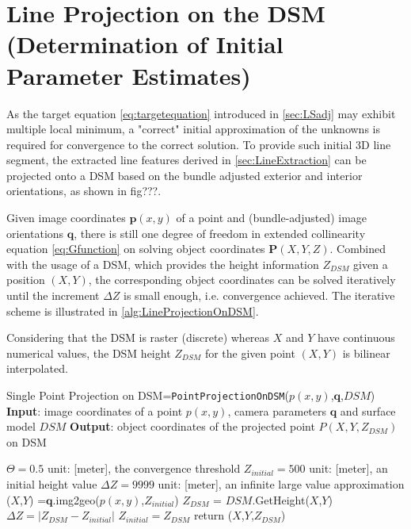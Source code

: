 \clearpage
\section{Line Projection on the DSM (Determination of Initial Parameter Estimates)}
\label{sec:LineProjectionOnDSM}

As the target equation \ref{eq:targetequation} introduced in \cref{sec:LSadj} may exhibit multiple local minimum, a "correct" initial approximation of the unknowns is required for convergence to the correct solution. To provide such initial 3D line segment, the extracted line features derived in \cref{sec:LineExtraction} can be projected onto a DSM based on the bundle adjusted exterior and interior orientations, as shown in fig???.


Given image coordinates $\mathbf{p}(x,y)$ of a point and (bundle-adjusted) image orientations $\mathbf{q}$, there is still one degree of freedom in extended collinearity equation \eqref{eq:Gfunction} on solving object coordinates $\mathbf{P}(X,Y,Z)$. Combined with the usage of a DSM, which provides the height information $Z_{DSM}$ given a position $(X,Y)$, the corresponding object coordinates can be solved iteratively until the increment $\Delta Z$ is small enough, i.e. convergence achieved. The iterative scheme is illustrated in \cref{alg:LineProjectionOnDSM}.

Considering that the DSM is raster (discrete) whereas $X$ and $Y$ have continuous numerical values, the DSM height $Z_{DSM}$ for the given point $(X,Y)$ is bilinear interpolated.

\begin{Algorithmus}
\caption{Single Point Projection on DSM\newline
	[$X$,$Y$,$Z_{DSM}$]=\texttt{PointProjectionOnDSM}($p(x,y)$,$\mathbf{q}$,$DSM$)\newline
	\textbf{Input}: image coordinates of a point $p(x,y)$, 
					camera parameters $\mathbf{q}$ and
					surface model $DSM$\newline
	\textbf{Output}: object coordinates of the projected point $P(X,Y,Z_{DSM})$ on DSM
}
\label{alg:LineProjectionOnDSM}
\begin{algorithmic}
\State $\Theta=0.5$
\Comment unit: [meter], the convergence threshold
\State $Z_{initial}=500$
\Comment unit: [meter], an initial height value
\State $\Delta Z=9999$
\Comment unit: [meter], an infinite large value approximation
	\State ($X$,$Y$) =$\mathbf{q}$.img2geo($p(x,y)$,$Z_{initial}$)
	\State $Z_{DSM}$ = $DSM$.GetHeight($X$,$Y$)
	\State $\Delta Z=|Z_{DSM}-Z_{initial}|$
	\State $Z_{initial}=Z_{DSM}$
\EndWhile
\State return ($X$,$Y$,$Z_{DSM}$)

\end{algorithmic}
\end{Algorithmus}



